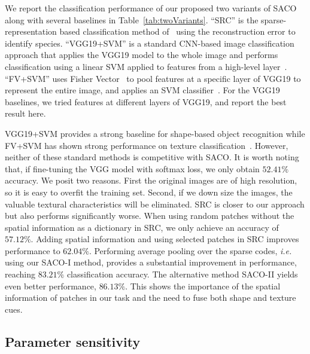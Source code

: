 \documentclass[10pt,twocolumn,letterpaper]{article}
\def\ie{\emph{i.e. }}
\begin{document}
We report the classification performance of our proposed two variants of SACO
along with several baselines in Table~\ref{tab:twoVariants}.  ``SRC'' is the
sparse-representation based classification method of~\cite{wright2009robust}
using the reconstruction error to identify species.  ``VGG19+SVM'' is a
standard CNN-based image classification approach that applies the VGG19 model
to the whole image and performs classification using a linear SVM applied to
features from a high-level layer~\cite{donahue2013decaf}.  ``FV+SVM'' uses
Fisher Vector~\cite{perronnin2010improving} to pool features at a specific
layer of VGG19 to represent the entire image, and applies an SVM
classifier~\cite{cimpoi2015deep}.  For the VGG19 baselines, we tried features
at different layers of VGG19, and report the best result here.

VGG19+SVM provides a strong baseline for shape-based object recognition while
FV+SVM has shown strong performance on texture
classification~\cite{cimpoi2015deep}.
However, neither of these standard methods is competitive with SACO.
It is worth noting that, if fine-tuning the VGG model with softmax loss,
we only obtain $52.41\%$ accuracy. We posit two reasons.
First the original images are of high resolution, so it is easy to overfit the training set.
Second, if we down size the images, the valuable textural characteristics will be eliminated.
SRC is closer to our approach but also performs significantly worse.  When using
random patches without the spatial information as a dictionary in SRC, we only
achieve an accuracy of $57.12\%$.  Adding spatial information and using
selected patches in SRC improves performance to $62.04\%$.  Performing average
pooling over the sparse codes, \ie using our SACO-I method, provides a
substantial improvement in performance, reaching $83.21\%$ classification
accuracy.  The alternative method SACO-II yields even better performance,
$86.13\%$.  This shows the importance of the spatial information of patches in
our task and the need to fuse both shape and texture cues.


\subsection{Parameter sensitivity}
\label{ssec:paramStudy}
\end{document}
